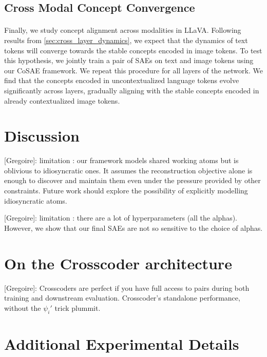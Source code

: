 \documentclass{article}
\newcommand{\greg}[1]{{\color{indigo}[Gregoire]: #1}}
\begin{document}
\subsection{Cross Modal Concept Convergence}

\paragraph{} Finally, we study concept alignment across modalities in LLaVA. Following results from \cref{sec:cross_layer_dynamics}, we expect that the dynamics of text tokens will converge towards the stable concepts encoded in image tokens. To test this hypothesis, we jointly train a pair of SAEs on text and image tokens using our CoSAE framework. We repeat this procedure for all layers of the network. We find that the concepts encoded in uncontextualized language tokens evolve significantly across layers, gradually aligning with the stable concepts encoded in already contextualized image tokens.

\section{Discussion}

\greg{limitation : our framework models shared working atoms but is oblivious to idiosyncratic ones. It assumes the reconstruction objective alone is enough to discover and maintain them even under the pressure provided by other constraints. Future work should explore the possibility of explicitly modelling idiosyncratic atoms.}

\greg{limitation : there are a lot of hyperparameters (all the alphas). However, we show that our final SAEs are not so sensitive to the choice of alphas.}

% 
% 

\newpage
\appendix

\section{On the Crosscoder architecture}

\greg{Crosscoders are perfect if you have full access to pairs during both training and downstream evaluation. Crosscoder's standalone performance, without the $\psi_i'$ trick plummit.}

\section{Additional Experimental Details}
\end{document}
